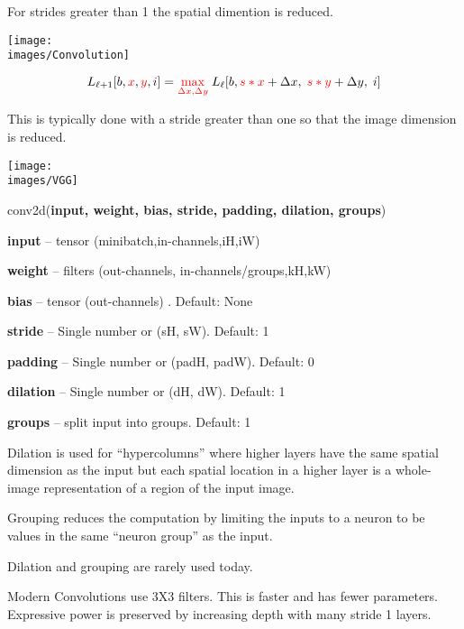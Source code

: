 {\vfill
For strides greater than 1 the spatial dimention is reduced.


\centerline{\texttt{[image: \\images/Convolution]}}

\vfill
$$L_{{\ell+1}}[b,{\color{red}x},{\color{red}y},i] = {\color{red} \max_{\Delta x, \Delta y}}\; L_{{\ell}}[b,{\color{red} s*x} + \Delta x,\; {\color{red} s*y} + \Delta y,\; i]$$

\vfill
This is typically done with a stride greater than one so that the image dimension is reduced.


\centerline{\texttt{[image: \\images/VGG]}}


conv2d({\bf input, weight, bias, stride, padding, dilation, groups})

\bigskip
{\bf input} – tensor (minibatch,in-channels,iH,iW)

\medskip
{\bf weight} – filters (out-channels, in-channels/groups,kH,kW)

\medskip
{\bf bias} – tensor (out-channels) . Default: None

\medskip
{\bf stride} – Single number or (sH, sW). Default: 1

\medskip
{\bf padding} – Single number or (padH, padW). Default: 0

\medskip
{\bf dilation} – Single number or (dH, dW). Default: 1

\medskip
{\bf groups} – split input into groups. Default: 1


Dilation is used for ``hypercolumns'' where higher layers have the same spatial dimension as the input but each spatial location in a higher layer
is a whole-image representation of a region of the input image.

\vfill
Grouping reduces the computation by limiting the inputs to a neuron to be values in the same ``neuron group'' as the input.

\vfill
Dilation and grouping are rarely used today.


Modern Convolutions use 3X3 filters.  This is faster and has fewer parameters.  Expressive power is preserved by increasing depth with many stride 1 layers.

}
